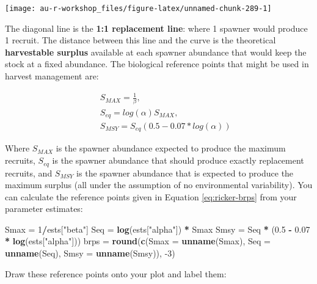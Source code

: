 \documentclass[]{book}
\newenvironment{Shaded}{\begin{snugshade}}{\end{snugshade}}
\newcommand{\DataTypeTok}[1]{\textcolor[rgb]{0.13,0.29,0.53}{#1}}
\newcommand{\DecValTok}[1]{\textcolor[rgb]{0.00,0.00,0.81}{#1}}
\newcommand{\FloatTok}[1]{\textcolor[rgb]{0.00,0.00,0.81}{#1}}
\newcommand{\KeywordTok}[1]{\textcolor[rgb]{0.13,0.29,0.53}{\textbf{#1}}}
\newcommand{\NormalTok}[1]{#1}
\newcommand{\OperatorTok}[1]{\textcolor[rgb]{0.81,0.36,0.00}{\textbf{#1}}}
\newcommand{\StringTok}[1]{\textcolor[rgb]{0.31,0.60,0.02}{#1}}
\begin{document}
\begin{center}\texttt{[image: au-r-workshop\_files/figure-latex/unnamed-chunk-289-1]} \end{center}

The diagonal line is the \textbf{1:1 replacement line}: where 1 spawner would produce 1 recruit. The distance between this line and the curve is the theoretical \textbf{harvestable surplus} available at each spawner abundance that would keep the stock at a fixed abundance. The biological reference points that might be used in harvest management are:

\begin{eqnarray*}
&& S_{MAX}=\frac{1}{\beta},\\
&& S_{eq}=log(\alpha) S_{MAX},\\
&& S_{MSY}=S_{eq} \left(0.5-0.07*log(\alpha)\right)
\label{eq:ricker-brps}
\end{eqnarray*}

Where \(S_{MAX}\) is the spawner abundance expected to produce the maximum recruits, \(S_{eq}\) is the spawner abundance that should produce exactly replacement recruits, and \(S_{MSY}\) is the spawner abundance that is expected to produce the maximum surplus (all under the assumption of no environmental variability). You can calculate the reference points given in Equation \eqref{eq:ricker-brps} from your parameter estimates:

\begin{Shaded}
\begin{Highlighting}[]
\NormalTok{Smax =}\StringTok{ }\DecValTok{1}\OperatorTok{/}\NormalTok{ests[}\StringTok{"beta"}\NormalTok{]}
\NormalTok{Seq =}\StringTok{ }\KeywordTok{log}\NormalTok{(ests[}\StringTok{"alpha"}\NormalTok{]) }\OperatorTok{*}\StringTok{ }\NormalTok{Smax}
\NormalTok{Smsy =}\StringTok{ }\NormalTok{Seq }\OperatorTok{*}\StringTok{ }\NormalTok{(}\FloatTok{0.5} \OperatorTok{-}\StringTok{ }\FloatTok{0.07} \OperatorTok{*}\StringTok{ }\KeywordTok{log}\NormalTok{(ests[}\StringTok{"alpha"}\NormalTok{]))}
\NormalTok{brps =}\StringTok{ }\KeywordTok{round}\NormalTok{(}\KeywordTok{c}\NormalTok{(}\DataTypeTok{Smax =} \KeywordTok{unname}\NormalTok{(Smax),}
               \DataTypeTok{Seq =} \KeywordTok{unname}\NormalTok{(Seq),}
               \DataTypeTok{Smsy =} \KeywordTok{unname}\NormalTok{(Smsy)), }\DecValTok{-3}\NormalTok{)}
\end{Highlighting}
\end{Shaded}

Draw these reference points onto your plot and label them:
\end{document}
